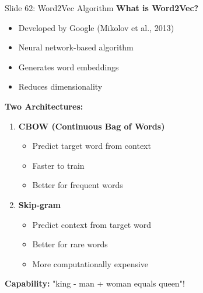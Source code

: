 \documentclass[8pt]{beamer}
\begin{document}
	\begin{frame}{Slide 62: Word2Vec Algorithm}
		\fontsize{6.5}{7.5}\selectfont
		\textbf{What is Word2Vec?}
		\begin{itemize}
			\item Developed by Google (Mikolov et al., 2013)
			\item Neural network-based algorithm
			\item Generates word embeddings
			\item Reduces dimensionality
		\end{itemize}
		
		\vspace{0.1cm}
		\textbf{Two Architectures:}
		\begin{enumerate}
			\item \textbf{CBOW (Continuous Bag of Words)}
			\begin{itemize}
				\item Predict target word from context
				\item Faster to train
				\item Better for frequent words
			\end{itemize}
			\item \textbf{Skip-gram}
			\begin{itemize}
				\item Predict context from target word
				\item Better for rare words
				\item More computationally expensive
			\end{itemize}
		\end{enumerate}
		
		\textcolor{myblue}{\textbf{Capability:}} "king - man + woman equals queen"!
	\end{frame}
	
\end{document}
